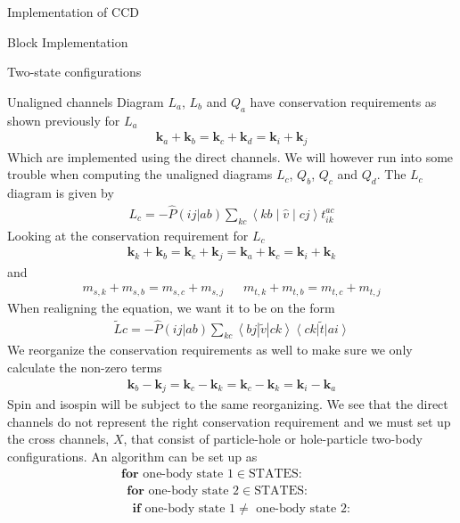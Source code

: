 \documentclass[twoside,english]{uiofysmaster}
\begin{document}
\begin{chapter}{Implementation of CCD}
\begin{section}{Block Implementation}
\begin{subsection}{Two-state configurations}
		\end{subsection}
		
		\begin{subsection}{Unaligned channels}
			Diagram $L_a$, $L_b$ and $Q_a$ have conservation requirements as shown previously for $L_a$
			\begin{align}
			 	\mathbf{k}_a + \mathbf{k}_b = \mathbf{k}_c + \mathbf{k}_d = \mathbf{k}_i + \mathbf{k}_j 
			\end{align}
			Which are implemented using the direct channels. We will however run into some trouble when computing the unaligned diagrams $L_c$, $Q_b$, $Q_c$ and $Q_d$. The $L_c$ diagram is given by 
			\begin{align}
				L_c = - \hat P(ij|ab) \sum_{kc} \left<kb\middle|\hat v\middle| cj \right> t_{ik}^{ac}
			\end{align}
			Looking at the conservation requirement for $L_c$
			\begin{align}
				\mathbf{k}_k + \mathbf{k}_b = \mathbf{k}_c + \mathbf{k}_j = \mathbf{k}_a + \mathbf{k}_c = \mathbf{k}_i + \mathbf{k}_k
			\end{align}
			and 
			\begin{align}
				m_{s,k} + m_{s,b} = m_{s,c} + m_{s,j}  \:\:\:\:\:\:\: m_{t,k} + m_{t,b} = m_{t,c} + m_{t,j} 
			\end{align}
			When realigning the equation, we want it to be on the form
			\begin{align}
				\tilde Lc = -\hat P(ij|ab) \sum_{kc} \left<bj | \tilde v | ck \right> \left< ck \right| \tilde t \left| ai \right>
			\end{align}
			We reorganize the conservation requirements as well to make sure we only calculate the non-zero terms
			\begin{align}
				\mathbf{k}_b - \mathbf{k}_j = \mathbf{k}_c - \mathbf{k}_k = \mathbf{k}_c - \mathbf{k}_k = \mathbf{k}_i - \mathbf{k}_a
			\end{align}
			Spin and isospin will be subject to the same reorganizing. We see that the direct channels do not represent the right conservation requirement and we must set up the cross channels, $X$, that consist of particle-hole or hole-particle two-body configurations. An algorithm can be set up as
			\begin{align*}
				&\mathbf{for } \text{ one-body state 1} \in \text{STATES}:\\
				&\:\: \mathbf{for } \text{ one-body state 2} \in \text{STATES}:\\
				&\:\:\:\: \mathbf{if} \text{ one-body state 1} \neq \text{ one-body state 2}:\\

\end{align*}
\end{subsection}
\end{section}
\end{chapter}
\end{document}

